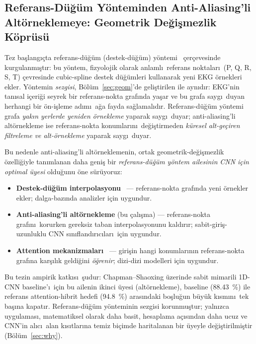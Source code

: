\documentclass[conference]{IEEEtran}
\begin{document}
\subsection{Referans-D\"{u}\u{g}\"{u}m Y\"{o}nteminden Anti-Aliasing'li
            Alt\"{o}rneklemeye: Geometrik De\u{g}i\c{s}mezlik K\"{o}pr\"{u}s\"{u}}
\label{sec:bridge}
Tez ba\c{s}lang\i \c{c}ta referans-d\"{u}\u{g}\"{u}m (destek-d\"{u}\u{g}\"{u}m)
y\"{o}ntemi~\cite{chen2021,xu2022} \c{c}er\c{c}evesinde kurgulanm\i \c{s}t\i r:
bu y\"{o}ntem, fizyolojik olarak anlaml\i\ referans noktalar\i\ (P, Q, R, S, T)
\c{c}evresinde cubic-spline destek d\"{u}\u{g}\"{u}mleri kullanarak yeni EKG
\"{o}rnekleri ekler. Y\"{o}ntemin \emph{sezgisi}, B\"{o}l\"{u}m~\ref{sec:geom}'de
geli\c{s}tirilen ile ayn\i d\i r: EKG'nin tan\i sal i\c{c}eri\u{g}i seyrek
bir referans-nokta graf\i nda ya\c{s}ar ve bu grafa sayg\i\ duyan herhangi
bir \"{o}n-i\c{s}leme ad\i m\i\ a\u{g}a fayda sa\u{g}lamal\i d\i r.
Referans-d\"{u}\u{g}\"{u}m y\"{o}ntemi grafa \emph{yak\i n yerlerde yeniden
\"{o}rnekleme} yaparak sayg\i\ duyar; anti-aliasing'li alt\"{o}rnekleme ise
referans-nokta konumlar\i n\i\ de\u{g}i\c{s}tirmeden \emph{k\"{u}resel
alt-ge\c{c}iren filtreleme ve alt-\"{o}rnekleme} yaparak sayg\i\ duyar.

Bu nedenle anti-aliasing'li alt\"{o}rneklemenin, ortak geometrik-de\u{g}i\c{s}mezlik
\"{o}zelli\u{g}iyle tan\i mlanan daha geni\c{s} bir
\emph{referans-d\"{u}\u{g}\"{u}m y\"{o}ntem ailesinin} \emph{CNN i\c{c}in optimal
\"{u}yesi} oldu\u{g}unu \"{o}ne s\"{u}r\"{u}yoruz:
\begin{itemize}
  \item \textbf{Destek-d\"{u}\u{g}\"{u}m interpolasyonu}~\cite{chen2021,xu2022}
        — referans-nokta graf\i nda yeni \"{o}rnekler ekler; dalga-baz\i nda
        analizler i\c{c}in uygundur.
  \item \textbf{Anti-aliasing'li alt\"{o}rnekleme} (bu \c{c}al\i \c{s}ma) —
        referans-nokta graf\i n\i\ korurken gereksiz taban interpolasyonunu
        kald\i r\i r; sabit-giri\c{s}-uzunluklu CNN s\i n\i fland\i r\i c\i lar\i\
        i\c{c}in uygundur.
  \item \textbf{Attention mekanizmalar\i }~\cite{oh2018,strodthoff2020} —
        giri\c{s}in hangi konumlar\i n\i n referans-nokta graf\i na kar\c{s}\i l\i k
        geldi\u{g}ini \emph{\"{o}\u{g}renir}; dizi-dizi modelleri i\c{c}in uygundur.
\end{itemize}
Bu tezin ampirik katk\i s\i\ \c{s}udur: Chapman--Shaoxing \"{u}zerinde sabit
mimarili 1D-CNN baseline'\i\ i\c{c}in bu ailenin ikinci \"{u}yesi
(alt\"{o}rnekleme), baseline (\SI{88,43}{\percent}) ile referans
attention-hibrit hedefi (\SI{94,8}{\percent}) aras\i ndaki bo\c{s}lu\u{g}un
b\"{u}y\"{u}k k\i sm\i n\i\ tek ba\c{s}\i na kapat\i r. Referans-d\"{u}\u{g}\"{u}m
y\"{o}nteminin sezgisi korunmu\c{s}tur; yaln\i zca uygulamas\i, matematiksel
olarak daha basit, hesaplama a\c{c}\i s\i ndan daha ucuz ve CNN'in al\i c\i\
alan k\i s\i tlar\i na temiz bi\c{c}imde haritalanan bir \"{u}yeyle de\u{g}i\c{s}tirilmi\c{s}tir
(B\"{o}l\"{u}m~\ref{sec:why}).
\end{document}
